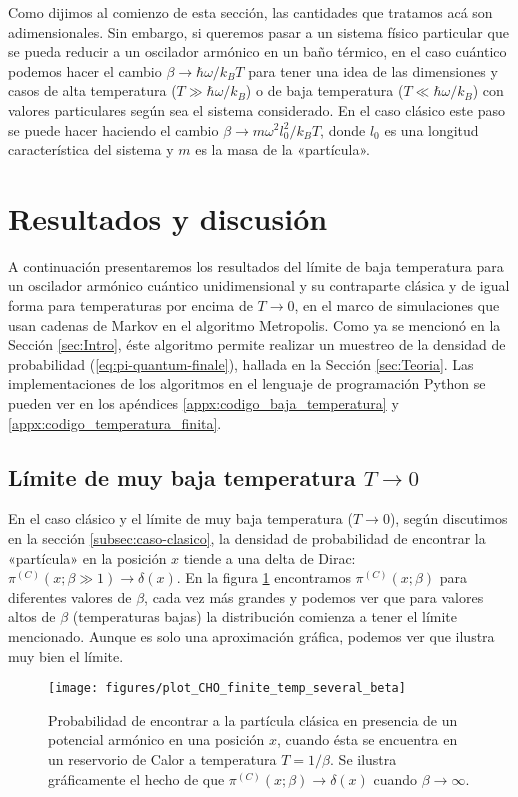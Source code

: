 \documentclass[%
 reprint,
 amsmath,amssymb,
 aps,
 pra,
]{revtex4-2}
\begin{document}
Como dijimos al comienzo de esta sección, las cantidades que tratamos acá son adimensionales. Sin embargo, si queremos pasar a un sistema físico particular que se pueda reducir a un oscilador armónico en un baño térmico, en el caso cuántico podemos hacer el cambio $\beta\rightarrow\hbar\omega / k_B T$ para tener una idea de las dimensiones y casos de alta temperatura  ($T \gg \hbar\omega / k_B$) o de baja temperatura ($T \ll \hbar\omega / k_B$) con valores particulares según sea el sistema considerado. En el caso clásico este paso se puede hacer haciendo el cambio $\beta \rightarrow m\omega^2l_0^2/k_B T$, donde $l_0$ es una longitud característica del sistema y $m$ es la masa de la «partícula».


\section{\label{sec:Resultados}Resultados y discusión}
A continuación presentaremos los resultados del límite de baja temperatura para un oscilador armónico cuántico unidimensional y su contraparte clásica y de igual forma para temperaturas por encima de $T \rightarrow 0$, en el marco de simulaciones que usan cadenas de Markov en el algoritmo Metropolis. Como ya se mencionó en la Sección \ref{sec:Intro}, éste algoritmo permite realizar un muestreo de la densidad de probabilidad (\ref{eq:pi-quantum-finale}), hallada en la Sección \ref{sec:Teoria}. Las implementaciones de los algoritmos en el lenguaje de programación Python se pueden ver en los apéndices \ref{appx:codigo_baja_temperatura} y \ref{appx:codigo_temperatura_finita}.

\subsection{Límite de muy baja temperatura \texorpdfstring{$T \rightarrow 0$}{T tendiendo a cero}\label{subsec:limite-T-0}}

En el caso clásico y el límite de muy baja temperatura ($T \rightarrow 0 $), según discutimos en la sección \ref{subsec:caso-clasico}, la densidad de probabilidad de encontrar la «partícula» en la posición $x$ tiende a una delta de Dirac: $\pi^{(C)}(x;\beta \gg 1) \rightarrow \delta(x)$. En la figura \ref{fig:classic_probability} encontramos $\pi^{(C)}(x;\beta)$ para diferentes valores de $\beta$, cada vez más grandes y podemos ver que para valores altos de $\beta$ (temperaturas bajas) la distribución comienza a tener el límite mencionado. Aunque es solo una aproximación gráfica, podemos ver que ilustra muy bien el límite.
\begin{figure}[!t]
	\centering
	\texttt{[image: figures/plot\_CHO\_finite\_temp\_several\_beta]}
	\caption{Probabilidad de encontrar a la partícula clásica en presencia de un potencial armónico en una posición $x$, cuando ésta se encuentra en un reservorio de Calor a temperatura $T=1/\beta$. Se ilustra gráficamente el hecho de que $\pi^{(C)}(x;\beta) \rightarrow \delta(x)$ cuando $\beta\rightarrow\infty$.}
	\label{fig:classic_probability}
\end{figure}
\end{document}
